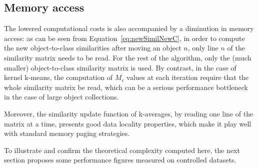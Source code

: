 \documentclass[a4paper,twoside]{article}
\begin{document}
\subsection{Memory access}

The lowered computational costs is also accompanied by a diminution in memory access: as can be seen from Equation~\ref{eq:newSimilNewC}, in order to compute the new object-to-class similarities after moving an object $n$, only line $n$ of the similarity matrix needs to be read. For the rest of the algorithm, only the (much smaller) object-to-class similarity matrix is used. By contrast, in the case of kernel k-means, the computation of $M_c$ values at each iteration require that the whole similarity matrix be read, which can be a serious performance bottleneck in the case of large object collections.

Moreover, the similarity update function of k-averages, by reading one line of the matrix at a time, presents good data locality properties, which make it play well with standard memory paging strategies.

To illustrate and confirm the theoretical complexity computed here, the next section proposes some performance figures measured on controlled datasets.
\end{document}
